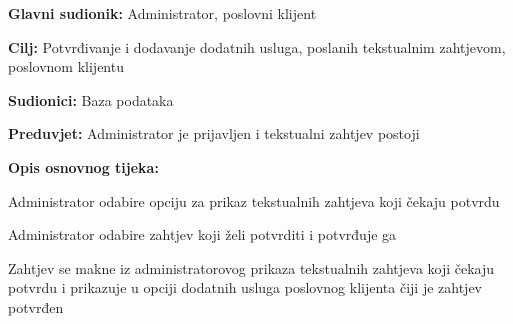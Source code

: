 				\noindent {}
				\begin{packed_item}
					
					\item \textbf{Glavni sudionik: } Administrator, poslovni klijent
					\item  \textbf{Cilj:} Potvrđivanje i dodavanje dodatnih usluga, poslanih tekstualnim zahtjevom, poslovnom klijentu
					\item  \textbf{Sudionici:} Baza podataka
					\item  \textbf{Preduvjet:} Administrator je prijavljen i tekstualni zahtjev postoji
					\item  \textbf{Opis osnovnog tijeka:}
					
					\item[] \begin{packed_enum}
						
						\item Administrator odabire opciju za prikaz tekstualnih zahtjeva koji čekaju potvrdu
						\item Administrator odabire zahtjev koji želi potvrditi i potvrđuje ga
						\item Zahtjev se makne iz administratorovog prikaza tekstualnih zahtjeva koji čekaju potvrdu i prikazuje u opciji dodatnih usluga poslovnog klijenta čiji je zahtjev potvrđen
						
					\end{packed_enum}
					
					
						
							
							
						
				\end{packed_item}
			

